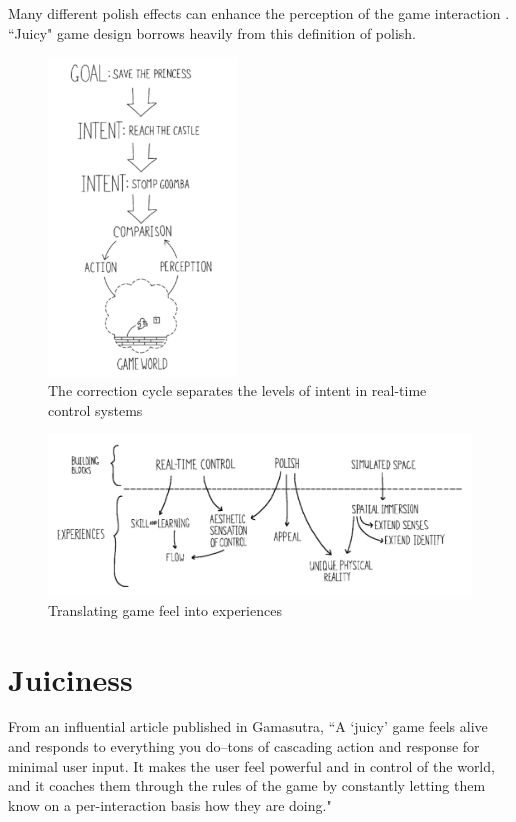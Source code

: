 Many different polish effects can enhance the perception of the game interaction \cite{swink2009game}. ``Juicy" game design borrows heavily from this definition of polish.

\begin{figure}
\centering
\includegraphics[width=50mm]{images/correction.pdf}
\caption{The correction cycle separates the levels of intent in real-time control systems}
\label{fig:correction}
\end{figure}

\begin{figure}
\centering
\includegraphics[width=150mm]{images/blocks.pdf}
\caption{Translating game feel into experiences}
\label{fig:blocks}
\end{figure}

\section{Juiciness}

From an influential article published in Gamasutra, ``A `juicy' game feels alive and responds to everything you do--tons of cascading action and response for minimal user input. It makes the user feel powerful and in control of the world, and it coaches them through the rules of the game by constantly letting them know on a per-interaction basis how they are doing." \cite{gamasutra}

